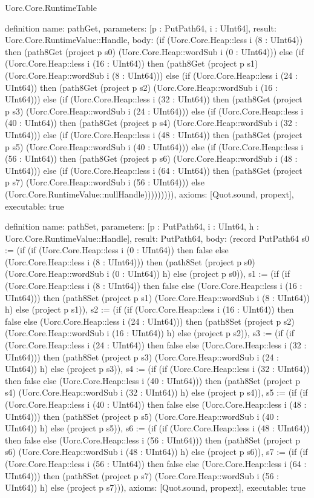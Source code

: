 \begin{lexlean}{Uorc.Core.RuntimeTable}
\begin{semanticmodule}
definition{
  name: pathGet,
  parameters: [p : PutPath64, i : UInt64],
  result: Uorc.Core.RuntimeValue::Handle,
  body: (if (Uorc.Core.Heap::less i (8 : UInt64)) then (path8Get (project p s0) (Uorc.Core.Heap::wordSub i (0 : UInt64))) else (if (Uorc.Core.Heap::less i (16 : UInt64)) then (path8Get (project p s1) (Uorc.Core.Heap::wordSub i (8 : UInt64))) else (if (Uorc.Core.Heap::less i (24 : UInt64)) then (path8Get (project p s2) (Uorc.Core.Heap::wordSub i (16 : UInt64))) else (if (Uorc.Core.Heap::less i (32 : UInt64)) then (path8Get (project p s3) (Uorc.Core.Heap::wordSub i (24 : UInt64))) else (if (Uorc.Core.Heap::less i (40 : UInt64)) then (path8Get (project p s4) (Uorc.Core.Heap::wordSub i (32 : UInt64))) else (if (Uorc.Core.Heap::less i (48 : UInt64)) then (path8Get (project p s5) (Uorc.Core.Heap::wordSub i (40 : UInt64))) else (if (Uorc.Core.Heap::less i (56 : UInt64)) then (path8Get (project p s6) (Uorc.Core.Heap::wordSub i (48 : UInt64))) else (if (Uorc.Core.Heap::less i (64 : UInt64)) then (path8Get (project p s7) (Uorc.Core.Heap::wordSub i (56 : UInt64))) else (Uorc.Core.RuntimeValue::nullHandle))))))))),
  axioms: [Quot.sound, propext],
  executable: true
}

definition{
  name: pathSet,
  parameters: [p : PutPath64, i : UInt64, h : Uorc.Core.RuntimeValue::Handle],
  result: PutPath64,
  body: (record PutPath64 {s0 := (if (if (Uorc.Core.Heap::less i (0 : UInt64)) then false else (Uorc.Core.Heap::less i (8 : UInt64))) then (path8Set (project p s0) (Uorc.Core.Heap::wordSub i (0 : UInt64)) h) else (project p s0)), s1 := (if (if (Uorc.Core.Heap::less i (8 : UInt64)) then false else (Uorc.Core.Heap::less i (16 : UInt64))) then (path8Set (project p s1) (Uorc.Core.Heap::wordSub i (8 : UInt64)) h) else (project p s1)), s2 := (if (if (Uorc.Core.Heap::less i (16 : UInt64)) then false else (Uorc.Core.Heap::less i (24 : UInt64))) then (path8Set (project p s2) (Uorc.Core.Heap::wordSub i (16 : UInt64)) h) else (project p s2)), s3 := (if (if (Uorc.Core.Heap::less i (24 : UInt64)) then false else (Uorc.Core.Heap::less i (32 : UInt64))) then (path8Set (project p s3) (Uorc.Core.Heap::wordSub i (24 : UInt64)) h) else (project p s3)), s4 := (if (if (Uorc.Core.Heap::less i (32 : UInt64)) then false else (Uorc.Core.Heap::less i (40 : UInt64))) then (path8Set (project p s4) (Uorc.Core.Heap::wordSub i (32 : UInt64)) h) else (project p s4)), s5 := (if (if (Uorc.Core.Heap::less i (40 : UInt64)) then false else (Uorc.Core.Heap::less i (48 : UInt64))) then (path8Set (project p s5) (Uorc.Core.Heap::wordSub i (40 : UInt64)) h) else (project p s5)), s6 := (if (if (Uorc.Core.Heap::less i (48 : UInt64)) then false else (Uorc.Core.Heap::less i (56 : UInt64))) then (path8Set (project p s6) (Uorc.Core.Heap::wordSub i (48 : UInt64)) h) else (project p s6)), s7 := (if (if (Uorc.Core.Heap::less i (56 : UInt64)) then false else (Uorc.Core.Heap::less i (64 : UInt64))) then (path8Set (project p s7) (Uorc.Core.Heap::wordSub i (56 : UInt64)) h) else (project p s7))}),
  axioms: [Quot.sound, propext],
  executable: true
}


\end{semanticmodule}
\end{lexlean}

